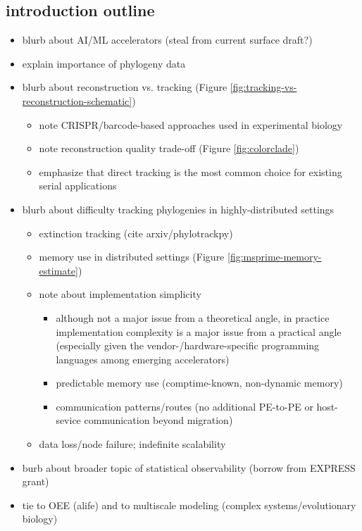 \subsection{introduction outline}

\begin{itemize}
\item blurb about AI/ML accelerators (steal from current surface draft?)
\item explain importance of phylogeny data
\item blurb about reconstruction vs. tracking (Figure \ref{fig:tracking-vs-reconstruction-schematic})
    \begin{itemize}
    \item note CRISPR/barcode-based approaches used in experimental biology
    \item note reconstruction quality trade-off (Figure \ref{fig:colorclade})
    \item emphasize that direct tracking is the most common choice for existing serial applications
    \end{itemize}
\item blurb about difficulty tracking phylogenies in highly-distributed settings
   \begin{itemize}
   \item extinction tracking (cite arxiv/phylotrackpy)
   \item memory use in distributed settings (Figure \ref{fig:msprime-memory-estimate})
   \item note about implementation simplicity
      \begin{itemize}
      \item although not a major issue from a theoretical angle, in practice implementation complexity is a major issue from a practical angle (especially given the vendor-/hardware-specific programming languages among emerging accelerators)
      \item predictable memory use (comptime-known, non-dynamic memory)
      \item communication patterns/routes (no additional PE-to-PE or host-sevice communication beyond migration)
      \end{itemize}
   \item data loss/node failure; indefinite scalability
   \end{itemize}
\item burb about broader topic of statistical observability (borrow from EXPRESS grant)
\item tie to OEE (alife) and to multiscale modeling (complex systems/evolutionary biology)

\end{itemize}

